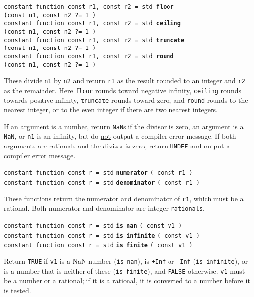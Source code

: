 \documentclass[12pt]{article}
\newcommand{\ttkey}[1]{{\tt \bfseries #1}}
\newenvironment{indpar}[1][0.3in]%
	{\begin{list}{}%
		     {\setlength{\itemsep}{0in}%
		      \setlength{\topsep}{0in}%
		      \setlength{\parsep}{1ex}%
		      \setlength{\labelwidth}{#1}%
		      \setlength{\leftmargin}{#1}%
		      \addtolength{\leftmargin}{\labelsep}}%
	 \item}%
	{\end{list}}
\begin{document}
{\tt constant function const r1, const r2 = std \ttkey{floor} \\
\hspace*{0.5in}(const n1, const n2 ?=~1 )} \\
{\tt constant function const r1, const r2 = std \ttkey{ceiling} \\
\hspace*{0.5in}(const n1, const n2 ?=~1 )} \\
{\tt constant function const r1, const r2 = std \ttkey{truncate} \\
\hspace*{0.5in}(const n1, const n2 ?=~1 )} \\
{\tt constant function const r1, const r2 = std \ttkey{round} \\
\hspace*{0.5in}(const n1, const n2 ?=~1 )}
\begin{indpar}
These divide {\tt n1} by {\tt n2} and return {\tt r1} as the
result rounded to an integer and {\tt r2} as the remainder.
Here {\tt floor} rounds toward negative infinity, {\tt ceiling}
rounds towards positive infinity, {\tt truncate} rounds toward
zero, and {\tt round} rounds to the nearest integer, or to the
even integer if there are two nearest integers.

If an argument is a number, return {\tt NaN}s if the divisor is
zero, an argument is a {\tt NaN}, or {\tt n1} is an infinity, but
do \underline{not} output a compiler error message.  If both
arguments are rationals and the divisor is zero, return
{\tt UNDEF} and output a compiler error message.
\end{indpar}

{\tt constant function const r = std} \ttkey{numerator} {\tt ( const r1 )} \\
{\tt constant function const r = std} \ttkey{denominator} {\tt ( const r1 )}
\begin{indpar}
These functions return the numerator and denominator of {\tt r1},
which must be a rational.
Both numerator and denominator are integer {\tt rationals}.
\end{indpar}

{\tt constant function const r = std} \ttkey{is nan} {\tt ( const v1 )} \\
{\tt constant function const r = std} \ttkey{is infinite} {\tt ( const v1 )} \\
{\tt constant function const r = std} \ttkey{is finite} {\tt ( const v1 )}
\begin{indpar}
Return {\tt TRUE} if {\tt v1} is a NaN number ({\tt is nan}),
is {\tt +Inf} or {\tt -Inf} ({\tt is infinite}), or
is a number that is neither of these ({\tt is finite}), and {\tt FALSE}
otherwise.  {\tt v1} must be a number or a rational;
if it is a rational, it is converted to a number before it is tested.
\end{indpar}
\end{document}
